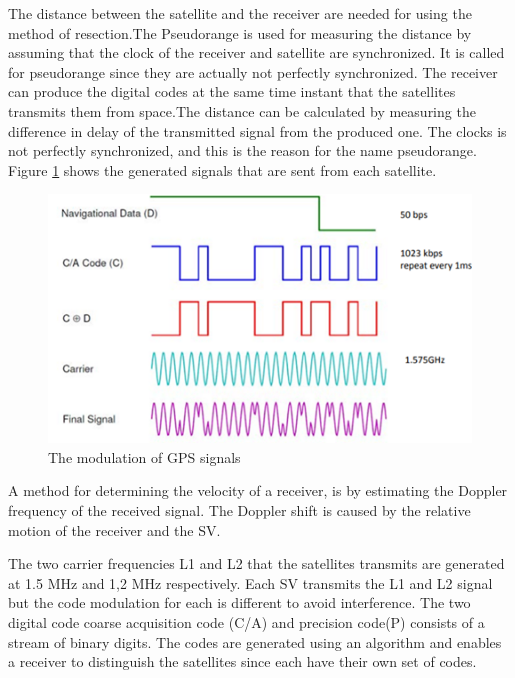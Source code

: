  The distance between the satellite and the receiver are needed for using the method of resection.The Pseudorange is used for measuring the distance by assuming that the clock of the receiver and satellite are synchronized. It is called for pseudorange since they are actually not perfectly synchronized. The receiver can produce the digital codes at the same time instant that the satellites transmits them from space.The distance can be calculated by measuring the difference in delay of the transmitted signal from the produced one. The clocks is not perfectly synchronized, and this is the reason for the name pseudorange. Figure \ref{fig:modulation} shows the generated signals that are sent from each satellite. 
  \begin{figure}[H]
\centering
\includegraphics[width=14 cm]{Project_Report/Images/code_data.png}
\caption{The modulation of GPS signals}
\label{fig:modulation}
\end{figure}
 
 
 A method for determining the velocity of a receiver, is by estimating the Doppler frequency of the received signal. The Doppler shift is caused by the relative motion of the receiver and the SV.
 
 The two carrier frequencies L1 and L2 that the satellites transmits are generated at 1.5 MHz and 1,2 MHz respectively.  Each SV transmits the L1 and L2 signal but the code modulation for each is different to avoid interference. The two digital code coarse acquisition code (C/A) and precision code(P) consists of a stream of binary digits. The codes are generated using an algorithm and enables a receiver to distinguish the satellites since each have their own set of codes. 
 
